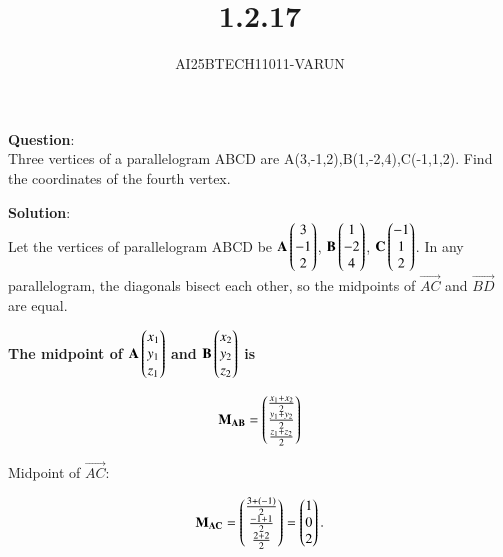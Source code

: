 \documentclass[journal]{IEEEtran}
\begin{document}

\vspace{3cm}

\title{1.2.17}
\author{AI25BTECH11011-VARUN}
 \maketitle
{\let\newpage\relax\maketitle}

\renewcommand{\thefigure}{\theenumi}
\renewcommand{\thetable}{\theenumi}
\setlength{\intextsep}{10pt} %


\renewcommand{\thetable}{\theenumi}
\textbf{Question}:\\
Three vertices of a parallelogram ABCD are A(3,-1,2),B(1,-2,4),C(-1,1,2). Find the coordinates of the fourth vertex.

\textbf{Solution}:\\
Let the vertices of parallelogram ABCD be
$\Vec{A}\myvec{3\\-1\\2}$, $\Vec{ B}\myvec{1\\-2\\4}$, $\Vec{C}\myvec{-1\\1\\2}$.
In any parallelogram, the diagonals bisect each other, so the midpoints of $\vec{AC}$ and $\vec{BD}$ are equal.

\textbf{The  midpoint of $\mathbf{A}\begin{pmatrix}x_1\\y_1\\z_1\end{pmatrix}$ and $\mathbf{B}\begin{pmatrix}x_2\\y_2\\z_2\end{pmatrix}$ is}

\begin{align}
    \mathbf{M_{AB}} = \begin{pmatrix}\frac{x_1+x_2}{2} \\ \frac{y_1+y_2}{2} \\ \frac{z_1+z_2}{2}\end{pmatrix}
\end{align}

Midpoint of $\vec{AC}$:

\begin{align}
\mathbf{M_{AC}}=\begin{pmatrix}\frac{3+(-1)}{2} \\ \frac{-1+1}{2} \\ \frac{2+2}{2}\end{pmatrix}=\begin{pmatrix}1\\0\\2\end{pmatrix}.
\end{align}
\end{document}
